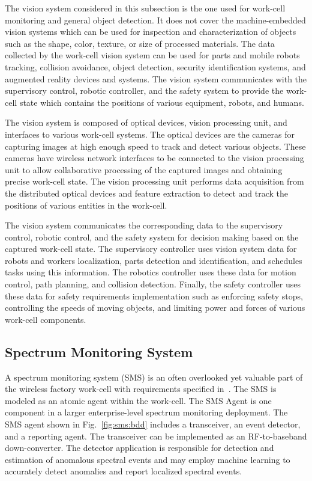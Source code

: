 \documentclass[journal, twoside]{IEEEtran}
\begin{document}
    The vision system considered in this subsection is the one used for work-cell monitoring and general object detection. It does not cover the machine-embedded vision systems which can be used for inspection and characterization of objects such as the shape, color, texture, or size of processed materials. The data collected by the work-cell vision system can be used for parts and mobile robots tracking, collision avoidance, object detection, security identification systems, and augmented reality devices and systems. The vision system communicates with the supervisory control, robotic controller, and the safety system to provide the work-cell state which contains the positions of various equipment, robots, and humans. 
    
   The vision system is composed of optical devices, vision processing unit, and interfaces to various work-cell systems. The optical devices are the cameras for capturing images at high enough speed to track and detect various objects. These cameras have wireless network interfaces to be connected to the vision processing unit to allow collaborative processing of the captured images and obtaining precise work-cell state. The vision processing unit performs data acquisition from the distributed optical devices and feature extraction to detect and track the positions of various entities in the work-cell. 
   
   The vision system communicates the corresponding data to the supervisory control, robotic control, and the safety system for decision making based on the captured work-cell state. The supervisory controller uses vision system data for robots and workers localization, parts detection and identification, and schedules tasks using this information. The robotics controller uses these data for motion control, path planning, and collision detection. Finally, the safety controller uses these data for safety requirements implementation such as enforcing safety stops, controlling the speeds of moving objects, and limiting power and forces of various work-cell components.    
	
	\subsection{Spectrum Monitoring System}\label{sec:sms}
	A spectrum monitoring system (SMS) is an often overlooked yet valuable part of the wireless factory work-cell with requirements specified in~\cite{Candell2017.SMS}.  The SMS is modeled as an atomic agent within the work-cell.  The SMS Agent is one component in a larger enterprise-level spectrum monitoring deployment.  The SMS agent shown in Fig.~\ref{fig:sms:bdd} includes a transceiver, an event detector, and a reporting agent.  The transceiver can be implemented as an RF-to-baseband down-converter.  The detector application is responsible for detection and estimation of anomalous spectral events and may employ machine learning to accurately detect anomalies and report localized spectral events.
	
\end{document}
